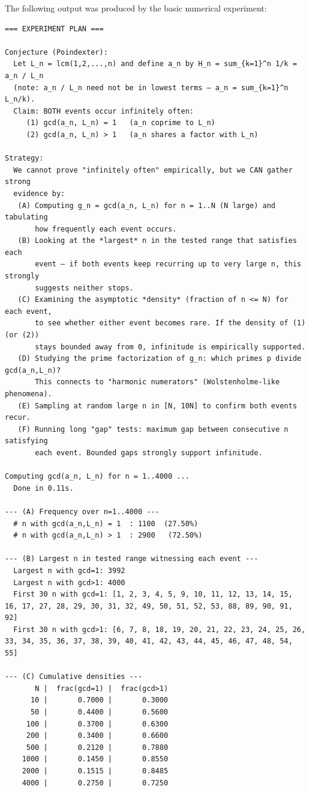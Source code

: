 \documentclass[11pt]{article}
\begin{document}
The following output was produced by the basic numerical experiment:

\begin{lstlisting}
=== EXPERIMENT PLAN ===

Conjecture (Poindexter):
  Let L_n = lcm(1,2,...,n) and define a_n by H_n = sum_{k=1}^n 1/k = a_n / L_n
  (note: a_n / L_n need not be in lowest terms — a_n = sum_{k=1}^n L_n/k).
  Claim: BOTH events occur infinitely often:
     (1) gcd(a_n, L_n) = 1   (a_n coprime to L_n)
     (2) gcd(a_n, L_n) > 1   (a_n shares a factor with L_n)

Strategy:
  We cannot prove "infinitely often" empirically, but we CAN gather strong
  evidence by:
   (A) Computing g_n = gcd(a_n, L_n) for n = 1..N (N large) and tabulating
       how frequently each event occurs.
   (B) Looking at the *largest* n in the tested range that satisfies each
       event — if both events keep recurring up to very large n, this strongly
       suggests neither stops.
   (C) Examining the asymptotic *density* (fraction of n <= N) for each event,
       to see whether either event becomes rare. If the density of (1) (or (2))
       stays bounded away from 0, infinitude is empirically supported.
   (D) Studying the prime factorization of g_n: which primes p divide gcd(a_n,L_n)?
       This connects to "harmonic numerators" (Wolstenholme-like phenomena).
   (E) Sampling at random large n in [N, 10N] to confirm both events recur.
   (F) Running long "gap" tests: maximum gap between consecutive n satisfying
       each event. Bounded gaps strongly support infinitude.

Computing gcd(a_n, L_n) for n = 1..4000 ...
  Done in 0.11s.

--- (A) Frequency over n=1..4000 ---
  # n with gcd(a_n,L_n) = 1  : 1100  (27.50%)
  # n with gcd(a_n,L_n) > 1  : 2900   (72.50%)

--- (B) Largest n in tested range witnessing each event ---
  Largest n with gcd=1: 3992
  Largest n with gcd>1: 4000
  First 30 n with gcd=1: [1, 2, 3, 4, 5, 9, 10, 11, 12, 13, 14, 15, 16, 17, 27, 28, 29, 30, 31, 32, 49, 50, 51, 52, 53, 88, 89, 90, 91, 92]
  First 30 n with gcd>1: [6, 7, 8, 18, 19, 20, 21, 22, 23, 24, 25, 26, 33, 34, 35, 36, 37, 38, 39, 40, 41, 42, 43, 44, 45, 46, 47, 48, 54, 55]

--- (C) Cumulative densities ---
       N |  frac(gcd=1) |  frac(gcd>1)
      10 |       0.7000 |       0.3000
      50 |       0.4400 |       0.5600
     100 |       0.3700 |       0.6300
     200 |       0.3400 |       0.6600
     500 |       0.2120 |       0.7880
    1000 |       0.1450 |       0.8550
    2000 |       0.1515 |       0.8485
    4000 |       0.2750 |       0.7250


\end{lstlisting}
\end{document}
